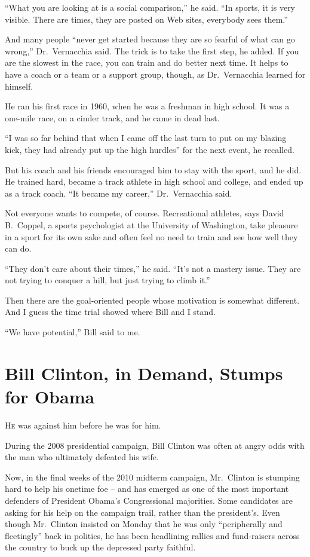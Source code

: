 ﻿\documentclass[12pt]{article}
\begin{document}
``What you are looking at is a social comparison,'' he said. ``In sports, it is very visible. There
are times, they are posted on Web sites, everybody sees them.''

And many people ``never get started because they are so fearful of what can go wrong,''
Dr.~Vernacchia said. The trick is to take the first step, he added. If you are the slowest in the
race, you can train and do better next time. It helps to have a coach or a team or a support group,
though, as Dr.~Vernacchia learned for himself.

He ran his first race in 1960, when he was a freshman in high school. It was a one-mile race, on a
cinder track, and he came in dead last.

``I was so far behind that when I came off the last turn to put on my blazing kick, they had already
put up the high hurdles'' for the next event, he recalled.

But his coach and his friends encouraged him to stay with the sport, and he did. He trained hard,
became a track athlete in high school and college, and ended up as a track coach. ``It became my
career,'' Dr.~Vernacchia said.

Not everyone wants to compete, of course. Recreational athletes, says David B.~Coppel, a sports
psychologist at the University of Washington, take pleasure in a sport for its own sake and often
feel no need to train and see how well they can do.

``They don't care about their times,'' he said. ``It's not a mastery issue. They are not trying to
conquer a hill, but just trying to climb it.''

Then there are the goal-oriented people whose motivation is somewhat different. And I guess the time
trial showed where Bill and I stand.

``We have potential,'' Bill said to me.

\pagebreak
\section{Bill Clinton, in Demand, Stumps for Obama}

\lettrine{H}{e} was against him before he was for him.

During the 2008 presidential campaign, Bill Clinton was often at angry odds with the man who
ultimately defeated his wife.

Now, in the final weeks of the 2010 midterm campaign, Mr.~Clinton is stumping hard to help his
onetime foe -- and has emerged as one of the most important defenders of President Obama's
Congressional majorities. Some candidates are asking for his help on the campaign trail, rather than
the president's. Even though Mr.~Clinton insisted on Monday that he was only ``peripherally and
fleetingly'' back in politics, he has been headlining rallies and fund-raisers across the country to
buck up the depressed party faithful.
\end{document}
